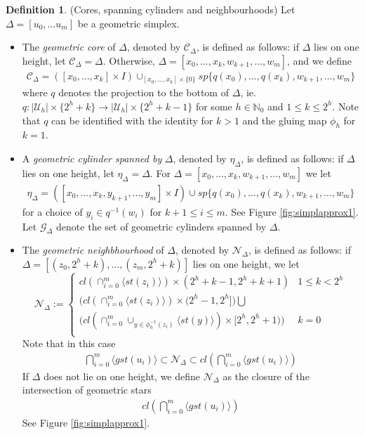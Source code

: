 \documentclass[a4paper,11pt]{article}
\theoremstyle{definition}
\newtheorem{definition}{Definition}[section]
\theoremstyle{plain}
\theoremstyle{remark}
\begin{document}
\begin{definition} (Cores, spanning cylinders and neighbourhoods) Let $\Delta = [u_0,\dots u_m]$ be a geometric simplex.
\begin{itemize}
\item The \textit{geometric core} of $\Delta$, denoted by $\mathscr{C}_{\Delta}$, is defined as follows: if $\Delta$ lies on one height, let $\mathscr{C}_{\Delta} = \Delta$. Otherwise, $\Delta = [x_0,\dots,x_k,w_{k+1},\dots,w_m]$, and we define 
\begin{align*}
\mathscr{C}_{\Delta}= ([x_0,\dots,x_k] \times I )\cup_{[x_0,\dots,x_k] \times \{0\}} sp\{q(x_0),\dots, q(x_k), w_{k+1},\dots,w_m\} 
\end{align*}
where $q$ denotes the projection to the bottom of $\Delta$, ie. $q: |\mathcal{U}_{h}| \times \{2^h+k\} \rightarrow |\mathcal{U}_{h}| \times \{2^h+k-1\}$ for some $h\in \mathbb{N}_{0}$ and $1\leq k\leq 2^h$. Note that $q$ can be identified with the identity for $k>1$ and the gluing map $\phi_{h}$ for $k=1$. 
\item A \textit{geometric cylinder spanned by} $\Delta$, denoted by $\eta_{\Delta}$, is defined as follows:  if $\Delta$ lies on one height, let $\eta_{\Delta} = \Delta$. For $\Delta = [x_0,\dots,x_k,w_{k+1},\dots,w_m]$ we let 
\begin{align*}
\eta_{\Delta}= ([x_0,\dots,x_k, y_{k+1},\dots, y_{m}] \times I )\cup sp\{q(x_0),\dots, q(x_k), w_{k+1},\dots,w_m\} 
\end{align*}
for a choice of $y_i\in q^{-1}(w_i)$ for $k+1\leq i\leq m$. See Figure \ref{fig:simplapprox1}. \\

Let $\mathcal{G}_{\Delta}$ denote the set of geometric cylinders spanned by $\Delta$.
\item The \textit{geometric neighbhourhood} of $\Delta$, denoted by $\mathcal{N}_{\Delta}$, is defined as follows: if $\Delta = [(z_0,2^{h}+k),\dots, (z_m,2^{h}+k)]$ lies on one height, we let 
 \[ \mathcal{N}_{\Delta} := \begin{cases} 
          cl(\cap_{i=0}^{m} \langle st(z_i) \rangle) \times (2^{h}+k-1, 2^{h}+k+1) & 1\leq k< 2^h \\
          \big( cl(\cap_{i=0}^{m} \langle st(z_i) \rangle) \times (2^h-1, 2^h]\big)\bigcup \\
\big( cl(\cap_{i=0}^{m}\cup_{y\in \phi_{h}^{-1}(z_{i})} \langle st(y) \rangle) \times [2^h, 2^h+1)\big)& k=0 \\ 
       \end{cases}  \] 
Note that in this case
\begin{align*}
\bigcap_{i=0}^m \langle gst(u_i) \rangle \subset \mathcal{N}_{\Delta} \subset cl(\bigcap_{i=0}^m \langle gst(u_i) \rangle )
\end{align*}
 If $\Delta$ does not lie on one height, we define $\mathcal{N}_{\Delta}$ as the closure of the intersection of geometric stars
\begin{align*}
cl(\bigcap_{i=0}^{m} \langle gst(u_i) \rangle)
\end{align*}
See Figure \ref{fig:simplapprox1}.
\end{itemize}
\end{definition}
\end{document}

